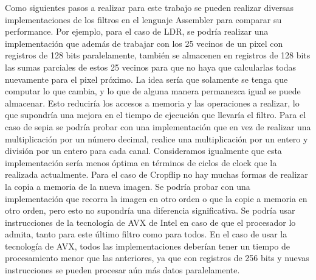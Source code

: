 \documentclass[a4paper]{article}
\newenvironment{codesnippet}{%
	\begin{Sbox}\begin{minipage}{\textwidth}\sffamily\small}%
	{\end{minipage}\end{Sbox}%
		\begin{center}%
		\vspace{-0.4cm}\colorbox{litegrey}{\TheSbox}\end{center}\vspace{0.3cm}}
\begin{document}
\par
Como siguientes pasos a realizar para este trabajo se pueden realizar diversas implementaciones de los filtros en el lenguaje Assembler para comparar su performance. Por ejemplo, para el caso de LDR, se podría realizar una implementación que además de trabajar con los 25 vecinos de un pixel con registros de 128 bits paralelamente, también se almacenen en registros de 128 bits las sumas parciales de estos 25 vecinos para que no haya que calcularlas todas nuevamente para el pixel próximo. La idea sería que solamente se tenga que computar lo que cambia, y lo que de alguna manera permanezca igual se puede almacenar. Esto reduciría los accesos a memoria y las operaciones a realizar, lo que supondría una mejora en el tiempo de ejecución que llevaría el filtro. Para el caso de sepia se podría probar con una implementación que en vez de realizar una multiplicación por un número decimal, realice una multiplicación por un entero y división por un entero para cada canal. Consideramos igualmente que esta implementación sería menos óptima en términos de ciclos de clock que la realizada actualmente. Para el caso de Cropflip no hay muchas formas de realizar la copia a memoria de la nueva imagen. Se podría probar con una implementación que recorra la imagen en otro orden o que la copie a memoria en otro orden, pero esto no supondría una diferencia significativa. Se podría usar instrucciones de la tecnología de AVX de Intel en caso de que el procesador lo admita, tanto para este último filtro como para todos. En el caso de usar la tecnología de AVX, todos las implementaciones deberían tener un tiempo de procesamiento menor que las anteriores, ya que con registros de 256 bits y nuevas instrucciones se pueden procesar aún más datos paralelamente.






\end{document}
